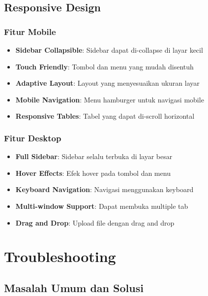 \documentclass[12pt,a4paper]{article}
\begin{document}
\subsection{Responsive Design}

\subsubsection{Fitur Mobile}
\begin{itemize}
\item \textbf{Sidebar Collapsible}: Sidebar dapat di-collapse di layar kecil
\item \textbf{Touch Friendly}: Tombol dan menu yang mudah disentuh
\item \textbf{Adaptive Layout}: Layout yang menyesuaikan ukuran layar
\item \textbf{Mobile Navigation}: Menu hamburger untuk navigasi mobile
\item \textbf{Responsive Tables}: Tabel yang dapat di-scroll horizontal
\end{itemize}

\subsubsection{Fitur Desktop}
\begin{itemize}
\item \textbf{Full Sidebar}: Sidebar selalu terbuka di layar besar
\item \textbf{Hover Effects}: Efek hover pada tombol dan menu
\item \textbf{Keyboard Navigation}: Navigasi menggunakan keyboard
\item \textbf{Multi-window Support}: Dapat membuka multiple tab
\item \textbf{Drag and Drop}: Upload file dengan drag and drop
\end{itemize}

\section{Troubleshooting}

\subsection{Masalah Umum dan Solusi}
\end{document}
